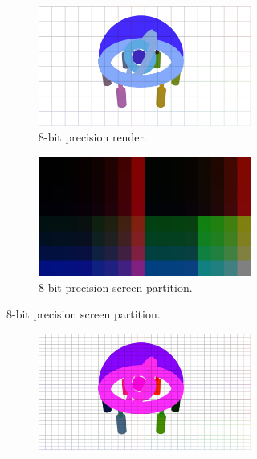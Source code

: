 \documentclass[conference]{IEEEtran}
\begin{document}
\begin{figure}[htbp]
\centering
\begin{subfigure}{\textwidth}
  \centering
    \begin{subfigure}{.49\textwidth}
      \centering
      \includegraphics[width=\linewidth]{8_render.jpg}
      \caption{8-bit precision render.}
      \label{fig:render_8}
    \end{subfigure}
    \begin{subfigure}{.49\textwidth}
      \centering
      \includegraphics[width=\linewidth]{8_partition.jpg}
      \caption{8-bit precision screen partition.}
      \label{fig:render_8}
    \end{subfigure}
  \label{fig:render_8}
\end{subfigure}
\par\medskip
\begin{subfigure}{\textwidth}
  \centering
    \begin{subfigure}{.49\textwidth}
      \centering
      \includegraphics[width=\linewidth]{16_render.jpg}

\end{subfigure}
\end{subfigure}
\end{figure}
\end{document}
